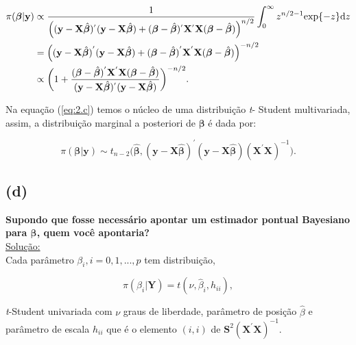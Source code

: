 \documentclass[12pt, oldfontcommands]{article}\usepackage[]{graphicx}\usepackage[]{color}
\begin{document}
\begin{align}
\begin{split}
 \pi(\bm{\beta}|\mathbf{y}) & \propto
 \frac{1}{\Big((\mathbf{y} - \mathbf{X} \hat{\bm{\beta}})^{'}
 (\mathbf{y} - \mathbf{X} \hat{\bm{\beta}})
 + (\bm{\beta} - \hat{\bm{\beta}})^{'}
 \mathbf{X}^{'}\mathbf{X}(\bm{\beta} - \hat{\bm{\beta}})\Big)^{n/2}}
 \int_{0}^{\infty}z^{n/2-1}{\rm exp}\{-z\}{\rm d}z \\ & =
 \Big((\mathbf{y} - \mathbf{X} \hat{\bm{\beta}})^{'}
 (\mathbf{y} - \mathbf{X} \hat{\bm{\beta}})
 + (\bm{\beta} - \hat{\bm{\beta}})^{'}
 \mathbf{X}^{'}\mathbf{X}(\bm{\beta} - \hat{\bm{\beta}})\Big)^{-n/2}
 \label{eq:2.c} \\ & \propto
 \bigg(1 + \frac{(\bm{\beta} - \hat{\bm{\beta}})^{'}
 \mathbf{X}^{'}\mathbf{X}(\bm{\beta} - \hat{\bm{\beta}})}{
 (\mathbf{y} - \mathbf{X} \hat{\bm{\beta}})^{'}
 (\mathbf{y} - \mathbf{X} \hat{\bm{\beta}})}\bigg)^{-n/2}.
\end{split}
\end{align}

Na equação (\ref{eq:2.c}) temos o núcleo de uma distribuição \textit{t}-
Student multivariada, assim, a distribuição marginal a posteriori de
\(\bm{\beta}\) é dada por:

\[
\boxed{\pi(\bm{\beta}|\mathbf{y}) \sim t_{n-2} \Big(\hat{\bm{\beta}},
       (\mathbf{y} - \mathbf{X} \hat{\bm{\beta}})^{'}
       (\mathbf{y} - \mathbf{X} \hat{\bm{\beta}})
       (\mathbf{X}^{'}\mathbf{X})^{-1}\Big).} \]

\subsection*{(d)} 

\textbf{Supondo que fosse necessário apontar um estimador pontual
        Bayesiano para \(\bm{\beta}\), quem você apontaria?} \\

\underline{Solução:} \\

Cada parâmetro \(\beta_{i}, i = 0, 1, ..., p\) tem distribuição,

\[ \pi(\beta_{i}|\mathbf{Y}) = t(\nu, \hat{\beta}_{i}, h_{ii}), \]

\textit{t}-Student univariada com \(\nu\) graus de liberdade, parâmetro
de posição \(\hat{\beta}\) e parâmetro de escala \(h_{ii}\) que é o
elemento \((i, i)\) de \(\mathbf{S}^{2}(\mathbf{X}^{'}\mathbf{X})^{-1}\).
\\
\end{document}
